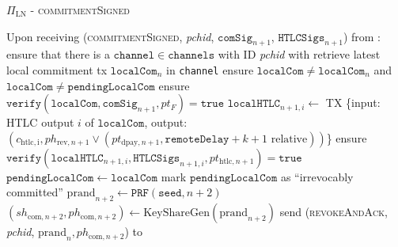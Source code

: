 \begin{protocolbox}{$\Pi_{\mathrm{LN}}$ - \textsc{commitmentSigned}}
  \label{alg:protocol:pay:commitmentSigned}
  \begin{algorithmic}[1]
    \State Upon receiving (\textsc{commitmentSigned}, \textit{pchid},
    $\mathtt{comSig}_{n+1}$, $\mathtt{HTLCSigs}_{n+1}$) from \bob:
    \Indent
      \State ensure that there is a $\mathtt{channel} \in \mathtt{channels}$
      with ID \textit{pchid} with \bob
      \State retrieve latest local commitment tx $\mathtt{localCom}_n$ in
      \texttt{channel}
      \State ensure $\mathtt{localCom} \neq \mathtt{localCom}_n$ and
      $\mathtt{localCom} \neq \mathtt{pendingLocalCom}$
      \State ensure $\mathtt{verify}\left(\mathtt{localCom},
      \mathtt{comSig}_{n+1}, pt_F\right) = \mathtt{true}$
        \State $\mathtt{localHTLC}_{n+1, i} \gets$ TX \{input: HTLC output $i$
        of $\mathtt{localCom}$, output: $\left(c_{\mathrm{htlc, i}},
        ph_{\mathrm{rev}, n+1} \vee \left(pt_{\mathrm{dpay}, n+1},
        \mathtt{remoteDelay} + k + 1 \text{ relative}\right)\right)$\}
        \State ensure $\mathtt{verify}\left(\mathtt{localHTLC}_{n+1, i},
        \mathtt{HTLCSigs}_{n+1, i}, pt_{\mathrm{htlc}, n+1}\right) =
        \mathtt{true}$
      \EndFor
      \State $\mathtt{pendingLocalCom} \gets \mathtt{localCom}$
      \State mark $\mathtt{pendingLocalCom}$ as ``irrevocably committed''
      \State $\mathrm{prand}_{n+2} \gets \texttt{PRF}\left(\mathtt{seed},
      n+2\right)$
      \State $\left(sh_{\mathrm{com}, n+2}, ph_{\mathrm{com}, n+2}\right) \gets
      \mathrm{KeyShareGen}\left(\mathrm{prand}_{n+2}\right)$
      \State send (\textsc{revokeAndAck}, \textit{pchid}, $\mathrm{prand}_n,
      ph_{\mathrm{com}, n+2}$) to \bob
    \EndIndent
  \end{algorithmic}
\end{protocolbox}

